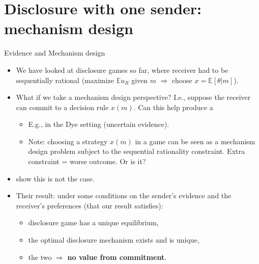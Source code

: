\documentclass[english,10pt
,aspectratio=169
]{beamer}
\begin{document}
\section{Disclosure with one sender: mechanism design}

\begin{frame}{Evidence and Mechanism design}
\begin{itemize}
	\item We have looked at disclosure games so far, where receiver had to be sequentially rational (maximize $\mathbb{E}u_R$ given $m$ $\Rightarrow$ choose $x=\mathbb{E}[\theta|m]$).
	\item What if we take a mechanism design perspective? I.e., suppose the receiver can \alert{commit} to a decision rule $x(m)$. Can this help produce a 
	\begin{itemize}
		\item E.g., in the Dye setting (uncertain evidence).
		\item Note: choosing a strategy $x(m)$ in a game can be seen as a mechanism design problem subject to the sequential rationality constraint. Extra constraint = worse outcome. Or is it?
	\end{itemize}

	\pause \bigskip 
	\item \citet*{hart_evidence_2017} show this is not the case.
	\item Their result: under some conditions on the sender's evidence and the receiver's preferences (that our result satisfies): 
	\begin{itemize}
		\item disclosure game has a unique equilibrium,
		\item the optimal disclosure mechanism exists and is unique,
		\item the two  $\Rightarrow$ \textbf{no value from commitment}.
	\end{itemize}
\end{itemize}
\end{frame}
\end{document}
